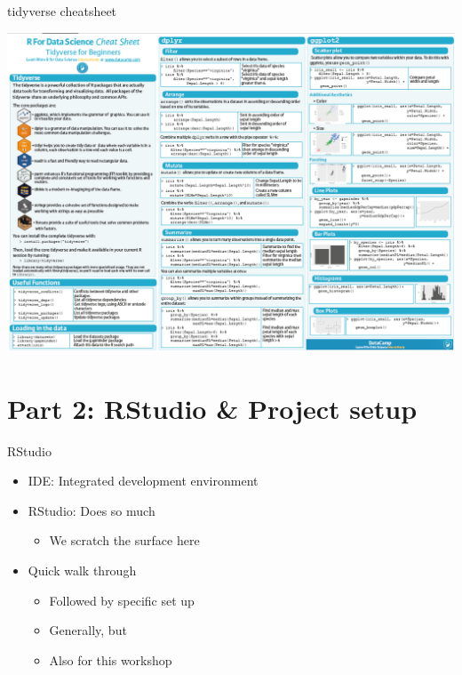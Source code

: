\documentclass[
  ignorenonframetext,
]{beamer}
\providecommand{\tightlist}{%
  \setlength{\itemsep}{0pt}\setlength{\parskip}{0pt}}
\begin{document}
\begin{frame}{tidyverse cheatsheet}
\protect\hypertarget{tidyverse-cheatsheet}{}

\includegraphics{../external/images/r_cheatsheet_tidy.PNG}

\end{frame}

\hypertarget{part-2-rstudio-project-setup}{%
\section{Part 2: RStudio \& Project
setup}\label{part-2-rstudio-project-setup}}

\begin{frame}{RStudio}
\protect\hypertarget{rstudio}{}

\begin{itemize}
\tightlist
\item
  IDE: Integrated development environment
\item
  RStudio: Does so much

  \begin{itemize}
  \tightlist
  \item
    We scratch the surface here
  \end{itemize}
\item
  Quick walk through

  \begin{itemize}
  \tightlist
  \item
    Followed by specific set up
  \item
    Generally, but
  \item
    Also for this workshop
  \end{itemize}
\end{itemize}

\end{frame}
\end{document}
